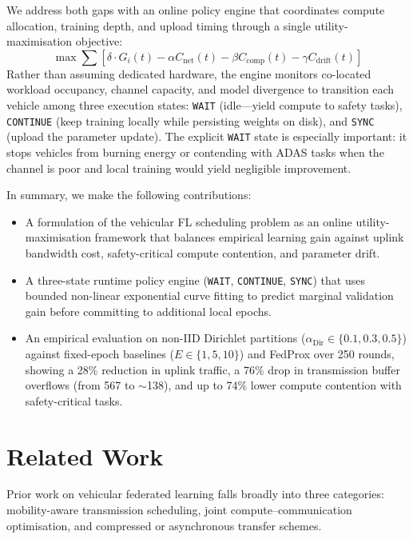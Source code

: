 \documentclass[conference]{IEEEtran}
\begin{document}
We address both gaps with an online policy engine that coordinates compute allocation, training depth, and upload timing through a single utility-maximisation objective:
\begin{equation*}
\max \sum \left[ \delta \cdot G_i(t) - \alpha C_{\text{net}}(t) - \beta C_{\text{comp}}(t) - \gamma C_{\text{drift}}(t) \right]
\end{equation*}
Rather than assuming dedicated hardware, the engine monitors co-located workload occupancy, channel capacity, and model divergence to transition each vehicle among three execution states: \texttt{WAIT} (idle---yield compute to safety tasks), \texttt{CONTINUE} (keep training locally while persisting weights on disk), and \texttt{SYNC} (upload the parameter update). The explicit \texttt{WAIT} state is especially important: it stops vehicles from burning energy or contending with ADAS tasks when the channel is poor and local training would yield negligible improvement.

In summary, we make the following contributions:
\begin{itemize}
    \item A formulation of the vehicular FL scheduling problem as an online utility-maximisation framework that balances empirical learning gain against uplink bandwidth cost, safety-critical compute contention, and parameter drift.
    \item A three-state runtime policy engine (\texttt{WAIT}, \texttt{CONTINUE}, \texttt{SYNC}) that uses bounded non-linear exponential curve fitting to predict marginal validation gain before committing to additional local epochs.
    \item An empirical evaluation on non-IID Dirichlet partitions ($\alpha_{\text{Dir}} \in \{0.1, 0.3, 0.5\}$) against fixed-epoch baselines ($E \in \{1, 5, 10\}$) and FedProx over 250 rounds, showing a 28\% reduction in uplink traffic, a 76\% drop in transmission buffer overflows (from 567 to ${\sim}$138), and up to 74\% lower compute contention with safety-critical tasks.
\end{itemize}

\section{Related Work}
Prior work on vehicular federated learning falls broadly into three categories: mobility-aware transmission scheduling, joint compute--communication optimisation, and compressed or asynchronous transfer schemes.
\end{document}

